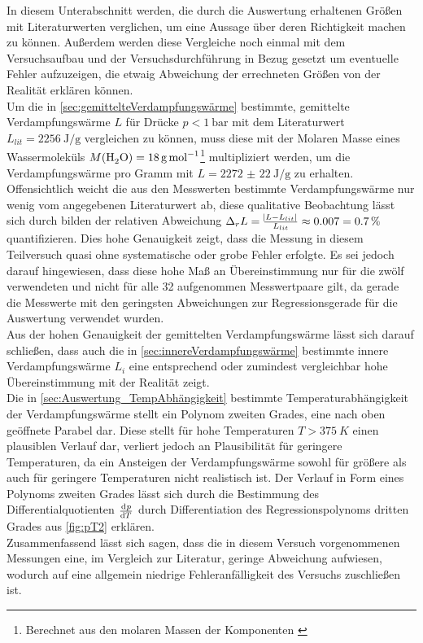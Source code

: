 In diesem Unterabschnitt werden, die durch die Auswertung erhaltenen
Größen mit Literaturwerten verglichen, um eine Aussage über deren 
Richtigkeit machen zu können. Außerdem werden diese Vergleiche noch
einmal mit dem Versuchsaufbau und der Versuchsdurchführung in Bezug
gesetzt um eventuelle Fehler aufzuzeigen, die etwaig Abweichung der 
errechneten Größen von der Realität erklären können.\\

Um die in \autoref{sec:gemittelteVerdampfungswärme} 
bestimmte, gemittelte Verdampfungswärme $L$ für Drücke 
$p < \SI{1}{\bar}$ mit dem Literaturwert $L_{lit} = 
\SI{2256}{\joule\per\g}$ \cite{Mende09}
vergleichen zu können, muss diese mit der 
Molaren Masse eines Wassermoleküls 
$M(\ce{H2O}) = \SI{18}{\g\per\mole}$\footnote{Berechnet aus den molaren Massen der Komponenten \cite{Kuchling07}} multipliziert werden, um die Verdampfungswärme pro Gramm mit 
$L =\SI{2272(22)}{\joule\per\g} $ zu erhalten.
Offensichtlich weicht die aus den Messwerten bestimmte Verdampfungswärme nur wenig vom angegebenen Literaturwert ab, diese qualitative Beobachtung lässt sich durch bilden der 
relativen Abweichung 
$ \Delta_{r} L = \tfrac{\envert{L - L_{lit}}}{L_{lit}} \approx 
\num{0.007} = \SI{0.7}{\percent}$ quantifizieren.
Dies hohe Genauigkeit zeigt, dass die Messung in diesem Teilversuch quasi
ohne systematische oder grobe Fehler erfolgte. Es sei jedoch darauf hingewiesen, dass
diese hohe Maß an Übereinstimmung nur für die zwölf verwendeten und nicht für alle 32 
aufgenommen Messwertpaare gilt, da gerade die Messwerte mit den geringsten Abweichungen 
zur Regressionsgerade für die Auswertung verwendet wurden.\\
Aus der hohen Genauigkeit der gemittelten Verdampfungswärme lässt sich darauf schließen,
dass auch die in \autoref{sec:innereVerdampfungswärme} bestimmte innere Verdampfungswärme
$L_{i}$ eine entsprechend oder zumindest vergleichbar hohe Übereinstimmung mit der Realität zeigt.\\

Die in \autoref{sec:Auswertung_TempAbhängigkeit} bestimmte Temperaturabhängigkeit der Verdampfungswärme
stellt ein Polynom zweiten Grades, eine nach oben geöffnete Parabel dar. 
	Diese stellt für hohe Temperaturen $ T > \SI{375}{K} $ einen plausiblen Verlauf dar,
verliert jedoch an Plausibilität für geringere Temperaturen, da ein Ansteigen der
Verdampfungswärme sowohl für größere als auch für geringere Temperaturen nicht
realistisch ist.
Der Verlauf in Form eines Polynoms zweiten Grades lässt sich durch die Bestimmung
des Differentialquotienten $\tod{p}{T}$ durch Differentiation des Regressionspolynoms
dritten Grades aus \autoref{fig:pT2} erklären.\\


Zusammenfassend lässt sich sagen, dass die in diesem Versuch vorgenommenen Messungen 
eine, im Vergleich zur Literatur, geringe Abweichung aufwiesen, wodurch auf eine allgemein niedrige Fehleranfälligkeit des Versuchs zuschließen ist. 